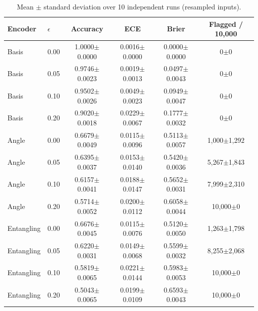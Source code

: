 \begin{table}[htbp]
\centering
\small
\caption{Mean $\pm$ standard deviation over 10 independent runs (resampled inputs).}
\label{tab:multiseed}
\begin{tabular}{llcccc}
\toprule
Encoder & $\epsilon$ & Accuracy & ECE & Brier & Flagged / 10{,}000\\
\midrule
Basis & 0.00 & 1.0000$\pm$0.0000 & 0.0016$\pm$0.0000 & 0.0000$\pm$0.0000 & 0$\pm$0\\
Basis & 0.05 & 0.9746$\pm$0.0023 & 0.0019$\pm$0.0013 & 0.0497$\pm$0.0043 & 0$\pm$0\\
Basis & 0.10 & 0.9502$\pm$0.0026 & 0.0049$\pm$0.0023 & 0.0949$\pm$0.0047 & 0$\pm$0\\
Basis & 0.20 & 0.9020$\pm$0.0018 & 0.0229$\pm$0.0067 & 0.1777$\pm$0.0032 & 0$\pm$0\\
\midrule
Angle & 0.00 & 0.6679$\pm$0.0049 & 0.0115$\pm$0.0096 & 0.5113$\pm$0.0057 & 1{,}000$\pm$1{,}292\\
Angle & 0.05 & 0.6395$\pm$0.0037 & 0.0153$\pm$0.0140 & 0.5420$\pm$0.0036 & 5{,}267$\pm$1{,}843\\
Angle & 0.10 & 0.6157$\pm$0.0041 & 0.0188$\pm$0.0147 & 0.5652$\pm$0.0031 & 7{,}999$\pm$2{,}310\\
Angle & 0.20 & 0.5714$\pm$0.0052 & 0.0200$\pm$0.0112 & 0.6058$\pm$0.0044 & 10{,}000$\pm$0\\
\midrule
Entangling & 0.00 & 0.6676$\pm$0.0045 & 0.0115$\pm$0.0076 & 0.5120$\pm$0.0050 & 1{,}263$\pm$1{,}798\\
Entangling & 0.05 & 0.6220$\pm$0.0031 & 0.0149$\pm$0.0068 & 0.5599$\pm$0.0032 & 8{,}255$\pm$2{,}068\\
Entangling & 0.10 & 0.5819$\pm$0.0065 & 0.0221$\pm$0.0144 & 0.5983$\pm$0.0053 & 10{,}000$\pm$0\\
Entangling & 0.20 & 0.5043$\pm$0.0065 & 0.0199$\pm$0.0109 & 0.6593$\pm$0.0043 & 10{,}000$\pm$0\\
\bottomrule
\end{tabular}
\end{table}
